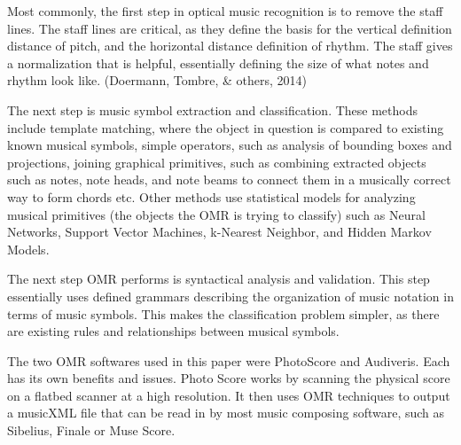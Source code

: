 \documentclass[12pt,twoside]{reedthesis}
\theoremstyle{definition}
\theoremstyle{definition}
\theoremstyle{definition}
\theoremstyle{remark}
\begin{document}
Most commonly, the first step in optical music recognition is to remove
the staff lines. The staff lines are critical, as they define the basis
for the vertical definition distance of pitch, and the horizontal
distance definition of rhythm. The staff gives a normalization that is
helpful, essentially defining the size of what notes and rhythm look
like. (Doermann, Tombre, \& others, 2014)

The next step is music symbol extraction and classification. These
methods include template matching, where the object in question is
compared to existing known musical symbols, simple operators, such as
analysis of bounding boxes and projections, joining graphical
primitives, such as combining extracted objects such as notes, note
heads, and note beams to connect them in a musically correct way to form
chords etc. Other methods use statistical models for analyzing musical
primitives (the objects the OMR is trying to classify) such as Neural
Networks, Support Vector Machines, k-Nearest Neighbor, and Hidden Markov
Models.

The next step OMR performs is syntactical analysis and validation. This
step essentially uses defined grammars describing the organization of
music notation in terms of music symbols. This makes the classification
problem simpler, as there are existing rules and relationships between
musical symbols.

The two OMR softwares used in this paper were PhotoScore and Audiveris.
Each has its own benefits and issues. Photo Score works by scanning the
physical score on a flatbed scanner at a high resolution. It then uses
OMR techniques to output a musicXML file that can be read in by most
music composing software, such as Sibelius, Finale or Muse Score.
\end{document}
